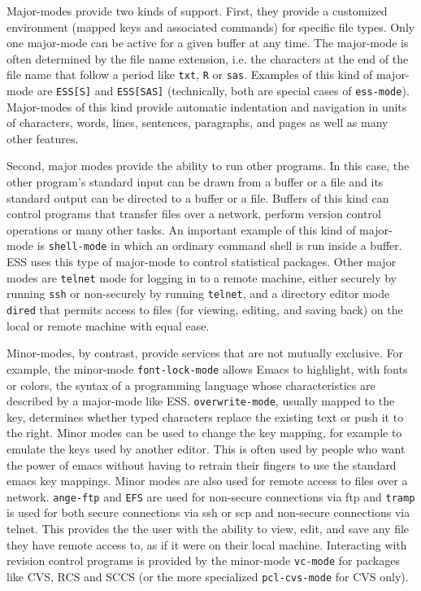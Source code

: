\documentclass{article}
\newcommand{\stexttt}[1]{{\small\texttt{#1}}}
\newcommand{\ssf}[1]{{\small\sf{#1}}}
\begin{document}
Major-modes provide two kinds of support.
First, they provide a customized environment (mapped keys and associated
commands) for specific file types.  Only one major-mode can be active
for a given buffer at any time.  The major-mode is often determined by
the file name extension, i.e. the characters at the end of the file
name that follow a period like \stexttt{txt}, \stexttt{R} or
\stexttt{sas}.
Examples of this kind of major-mode are \stexttt{ESS[S]} and \stexttt{ESS[SAS]}
(technically, both are special cases of \stexttt{ess-mode}).
Major-modes of this
kind provide automatic indentation and navigation in units of characters,
words, lines, sentences, paragraphs, and pages as well as many other
features.

Second, major modes provide the ability to run other programs.  In
this case, the other program's standard input can be drawn from a
buffer or a file and its standard output can be directed to a buffer
or a file.  Buffers of this kind can control programs that transfer
files over a network, perform version control operations or many other
tasks.  An important example of this kind of major-mode is
\stexttt{shell-mode} in which an ordinary command shell is run inside
a buffer.  ESS uses this type of major-mode to control statistical
packages.  Other major modes are \stexttt{telnet} mode for logging in
to a remote machine, either securely by running \stexttt{ssh} or
non-securely by running \texttt{telnet}, and a directory editor mode
\stexttt{dired} that permits access to files (for viewing, editing,
and saving back) on the local or remote machine with equal ease.

Minor-modes, by contrast, provide services that are not mutually
exclusive.  For example, the minor-mode
\stexttt{font-lock-mode} allows Emacs to highlight, with fonts or
colors, the syntax of a programming language whose characteristics are
described by a major-mode like ESS.  \stexttt{overwrite-mode}, usually
mapped to the \ssf{Insert} key, determines whether typed characters replace
the existing text or push it to the right.
Minor modes can be used to change the key mapping, for example to
emulate the keys used by another editor.  This is often used
by people who want the power of emacs without having to retrain their
fingers to use the standard emacs key mappings.
Minor modes are also used for remote access to files over a
network.  \stexttt{ange-ftp} and \stexttt{EFS} are used for non-secure 
connections via ftp and \stexttt{tramp} is used for both secure connections 
via ssh or scp and non-secure connections via telnet.  This provides the
the user with the ability to view, edit, and save any file they have remote
access to, as if it were on their local machine.  
Interacting with revision control
programs is provided by the minor-mode \stexttt{vc-mode} for packages
like CVS, RCS and SCCS (or the more
specialized \stexttt{pcl-cvs-mode} for CVS only).
\end{document}
